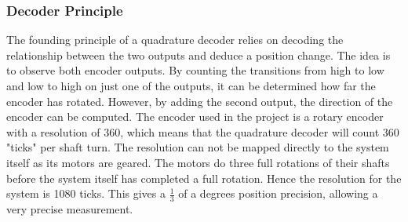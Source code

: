 \documentclass[../../../main]{subfiles}
\begin{document}
\subsubsection{Decoder Principle}
The founding principle of a quadrature decoder relies on decoding the relationship between the two outputs and deduce a position change. The idea is to observe both encoder outputs. By counting the transitions from high to low and low to high on just one of the outputs, it can be determined how far the encoder has rotated. However, by adding the second output, the direction of the encoder can be computed. The encoder used in the project is a rotary encoder with a resolution of 360\cite{encoder_datasheet}, which means that the quadrature decoder will count 360 "ticks" per shaft turn. The resolution  can not be mapped directly to the system itself as its motors are geared. The motors do three full rotations of their shafts before the system itself has completed a full rotation. Hence the resolution for the system is 1080 ticks. This gives a $\frac{1}{3}$ of a degrees position precision, allowing a very precise measurement.
\end{document}
